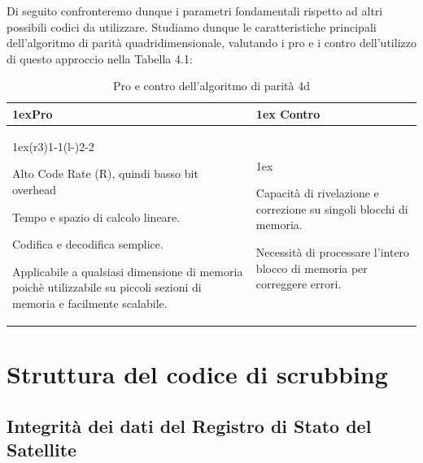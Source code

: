 \documentclass[LaM,binding=0.6cm]{../sapthesis}
\begin{document}
Di seguito confronteremo dunque i parametri fondamentali rispetto ad altri possibili codici da utilizzare.
Studiamo dunque le caratteristiche principali dell'algoritmo di parità quadridimensionale, valutando i pro e i contro dell'utilizzo di questo approccio nella Tabella 4.1:



\begin{table}
\begin{tabularx}{\linewidth}{>{\parskip1ex}X@{\kern4\tabcolsep}>{\parskip1ex}X}
\toprule
\hfil\bfseries Pro
&
\hfil\bfseries Contro
\\\cmidrule(r{3\tabcolsep}){1-1}\cmidrule(l{-\tabcolsep}){2-2}


     Alto Code Rate (R), quindi basso bit overhead\par
    
     Tempo e spazio di calcolo lineare.\par
    
    Codifica e decodifica semplice.\par
    
    Applicabile a qualsiasi dimensione di memoria poichè utilizzabile su piccoli sezioni
    di memoria e facilmente scalabile.\par


&

Capacità di rivelazione e correzione su singoli blocchi di memoria.\par

Necessità di processare l'intero blocco di memoria per correggere errori.\par


\\\bottomrule
\end{tabularx}
\caption{Pro e contro dell'algoritmo di parità 4d}
\end{table}

\clearpage

\section{Struttura del codice di scrubbing}


\subsection{Integrità dei dati del Registro di Stato del Satellite}
\end{document}
